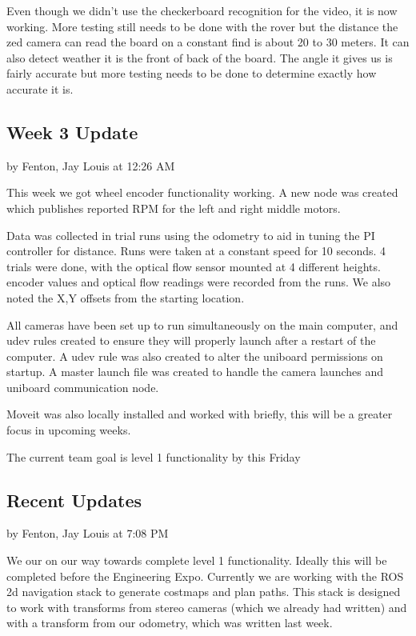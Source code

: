\documentclass[10pt, oneside,onecolumn]{IEEEtran}
\begin{document}
Even though we didn't use the checkerboard recognition for the video, it is now working. More testing still needs to be done with the rover but the distance the zed camera can read the board on a constant find is about 20 to 30 meters. It can also detect weather it is the front of back of the board. The angle it gives us is fairly accurate but more testing needs to be done to determine exactly how accurate it is.

\subsection{Week 3 Update}
by Fenton, Jay Louis at 12:26 AM

This week we got wheel encoder functionality working. A new node was created which publishes reported RPM for the left and right middle motors. 

Data was collected in trial runs using the odometry to aid in tuning the PI controller for distance. Runs were taken at a constant speed for 10 seconds. 4 trials were done, with the optical flow sensor mounted at 4 different heights. encoder values and optical flow readings were recorded from the runs. We also noted the X,Y offsets from the starting location.  

All cameras have been set up to run simultaneously on the main computer, and udev rules created to ensure they will properly launch after a restart of the computer. A udev rule was also created to alter the uniboard permissions on startup. A master launch file was created to handle the camera launches and uniboard communication node. 

Moveit was also locally installed and worked with briefly, this will be a greater focus in upcoming weeks. 

The current team goal is level 1 functionality by this Friday

\subsection{Recent Updates}
by Fenton, Jay Louis at 7:08 PM

We our on our way towards complete level 1 functionality. Ideally this will be completed before the Engineering Expo. Currently we are working with the ROS 2d navigation stack to generate costmaps and plan paths. This stack is designed to work with transforms from stereo cameras (which we already had written) and with a transform from our odometry, which was written last week. 
\end{document}
